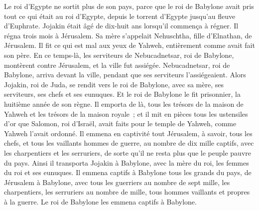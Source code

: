 \begin{multicols}{2}
Le roi d'Egypte ne sortit plus de son pays, parce que le roi de Babylone avait pris tout ce qui était au roi d'Egypte, depuis le torrent d'Egypte jusqu'au fleuve d'Euphrate.
Jojakin était âgé de dix-huit ans lorsqu'il commença à régner. Il régna trois mois à Jérusalem. Sa mère s'appelait Nehuschtha, fille d'Elnathan, de Jérusalem.
Il fit ce qui est mal aux yeux de Yahweh, entièrement comme avait fait son père.
En ce temps-là, les serviteurs de Nebucadnetsar, roi de Babylone, montèrent contre Jérusalem, et la ville fut assiégée.
Nebucadnetsar, roi de Babylone, arriva devant la ville, pendant que ses serviteurs l'assiégeaient.
Alors Jojakin, roi de Juda, se rendit vers le roi de Babylone, avec sa mère, ses serviteurs, ses chefs et ses eunuques. Et le roi de Babylone le fit prisonnier, la huitième année de son règne.
Il emporta de là, tous les trésors de la maison de Yahweh et les trésors de la maison royale~; et il mit en pièces tous les ustensiles d'or que Salomon, roi d'Israël, avait faits pour le temple de Yahweh, comme Yahweh l'avait ordonné.
Il emmena en captivité tout Jérusalem, à savoir, tous les chefs, et tous les vaillants hommes de guerre, au nombre de dix mille captifs, avec les charpentiers et les serruriers, de sorte qu'il ne resta plus que le peuple pauvre du pays.
Ainsi il transporta Jojakin à Babylone, avec la mère du roi, les femmes du roi et ses eunuques. Il emmena captifs à Babylone tous les grands du pays, de Jérusalem à Babylone,
avec tous les guerriers au nombre de sept mille, les charpentiers, les serruriers au nombre de mille, tous hommes vaillants et propres à la guerre. Le roi de Babylone les emmena captifs à Babylone.

\end{multicols}

